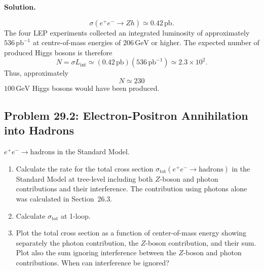 \documentclass[a4paper,11pt]{article}
\newenvironment{solution}{\par\medskip\noindent\textbf{Solution.}\par\smallskip}{\par\medskip}
\begin{document}
\begin{solution}
\begin{equation}
    \sigma(e^+e^-\to Zh)\simeq0.42\,\mathrm{pb}.
\end{equation}
The four LEP experiments collected an integrated luminosity of approximately
$536\,\mathrm{pb}^{-1}$ at centre-of-mass energies of $206\,\mathrm{GeV}$
or higher. The expected number of produced Higgs bosons is therefore
\begin{equation}
    N=\sigma L_{\mathrm{int}}
    \simeq(0.42\,\mathrm{pb})(536\,\mathrm{pb}^{-1})
    \simeq 2.3\times10^2.
\end{equation}
Thus, approximately
\begin{equation}
    \boxed{N\simeq230}
\end{equation}
$100\,\mathrm{GeV}$ Higgs bosons would have been produced.
\end{solution}

\subsection[Problem 29.2: \texorpdfstring{$e^+e^-\to$ hadrons}{electron-positron to hadrons}]{Problem 29.2: Electron-Positron Annihilation into Hadrons}

$e^+e^-\to\text{hadrons}$ in the Standard Model.

\begin{enumerate}
  \item Calculate the rate for the total cross section
  $\sigma_{\mathrm{tot}}(e^+e^-\to\text{hadrons})$ in the Standard Model at
  tree-level including both $Z$-boson and photon contributions and their
  interference. The contribution using photons alone was calculated in
  Section~26.3.

  \item Calculate $\sigma_{\mathrm{tot}}$ at 1-loop.

  \item Plot the total cross section as a function of center-of-mass energy
  showing separately the photon contribution, the $Z$-boson contribution, and
  their sum. Plot also the sum ignoring interference between the $Z$-boson and
  photon contributions. When can interference be ignored?
\end{enumerate}
\end{document}
